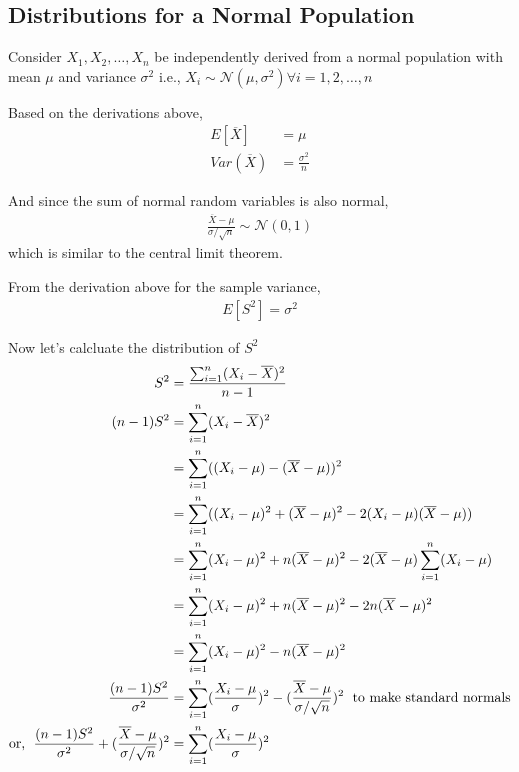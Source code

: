 \documentclass[../probability-notes.tex]{subfiles}
\begin{document}
    
    \subsection{Distributions for a Normal Population}\label{dist_for_normal}
    Consider $X_{1}, X_{2}, \ldots, X_{n}$ be independently derived from a normal population with mean $\mu$ and variance $\sigma^{2}$\newline
    i.e., $X_{i} \sim \mathcal{N}(\mu, \sigma^{2}) \forall i = 1, 2, \ldots, n$ \newline

    Based on the derivations above,
    \begin{align*}
        E[\overline{X}] &= \mu\\
        Var(\overline{X}) &= \frac{\sigma^{2}}{n}
    \end{align*}

    And since the sum of normal random variables is also normal,
    \begin{align*}
        \frac{\overline{X} - \mu}{\sigma/\sqrt{n}} \sim \mathcal{N}(0, 1)
    \end{align*}
    which is similar to the central limit theorem.\newline

    From the derivation above for the sample variance,
    \begin{align*}
        E[S^{2}] = \sigma^{2}
    \end{align*}

    Now let's calcluate the distribution of $S^{2}$
    \begin{align*}
        S^{2} &= \frac{\sum_{i=1}^{n} (X_{i} - \overline{X})^{2}}{n-1}\\
        (n-1)S^{2} &= \sum_{i=1}^{n} (X_{i} - \overline{X})^{2}\\
        &= \sum_{i=1}^{n} ((X_{i} - \mu) - (\overline{X} - \mu))^{2}\\
        &= \sum_{i=1}^{n} ((X_{i} - \mu)^{2} + (\overline{X} - \mu)^{2} - 2(X_{i} - \mu)(\overline{X} - \mu))\\
        &= \sum_{i=1}^{n} (X_{i} - \mu)^{2} + n(\overline{X} - \mu)^{2} - 2(\overline{X} - \mu)\sum_{i=1}^{n}(X_{i} - \mu)\\
        &= \sum_{i=1}^{n} (X_{i} - \mu)^{2} + n(\overline{X} - \mu)^{2} - 2n(\overline{X} - \mu)^{2}\\
        &= \sum_{i=1}^{n} (X_{i} - \mu)^{2} - n(\overline{X} - \mu)^{2}\\
        \frac{(n-1)S^{2}}{\sigma^{2}} &= \sum_{i=1}^{n} (\frac{X_{i} - \mu}{\sigma})^{2} - (\frac{\overline{X} - \mu}{\sigma/\sqrt{n}})^{2} \text{\; to make standard normals}\\
        \text{or, \;} \frac{(n-1)S^{2}}{\sigma^{2}} + (\frac{\overline{X} - \mu}{\sigma/\sqrt{n}})^{2} &= \sum_{i=1}^{n} (\frac{X_{i} - \mu}{\sigma})^{2}
    \end{align*}
\end{document}
